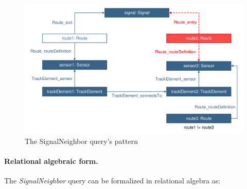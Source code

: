 % 
%   
%   
%   

\begin{figure}[Htb]
		\centering
		\includegraphics[scale=0.4]{figures/trainbenchmark-signalneighbor}
		\caption{The SignalNeighbor query's pattern}
		\label{fig:trainbenchmark-signalneighbor}
\end{figure}

\paragraph{Relational algebraic form.} The \textit{SignalNeighbor} query can be formalized in relational algebra as:

